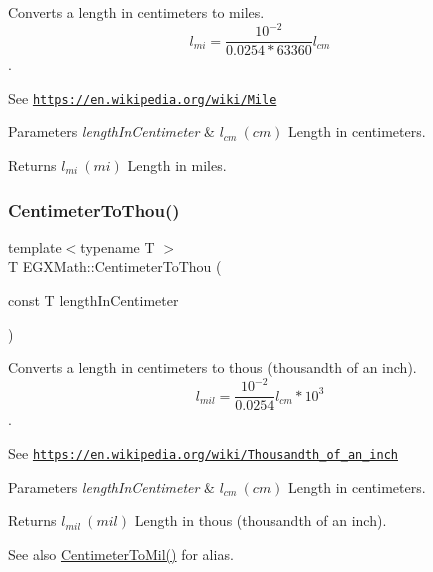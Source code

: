 Converts a length in centimeters to miles. \[ l_{mi}=\frac{10^{-2}}{0.0254 * 63360} l_{cm} \]. 

See \href{https://en.wikipedia.org/wiki/Mile}{\tt https\+://en.\+wikipedia.\+org/wiki/\+Mile} 
\begin{DoxyParams}{Parameters}
{\em length\+In\+Centimeter} & $ l_{cm}\ (cm)$ Length in centimeters. \\
\hline
\end{DoxyParams}
\begin{DoxyReturn}{Returns}
$ l_{mi}\ (mi)$ Length in miles. 
\end{DoxyReturn}
\mbox{\label{group___e_g_x_math-_conversions-_length_conversions-_centimeter-_imperial_ga06aee91cfbc90db20c6a085129dbf4fa}} 
\subsubsection{\texorpdfstring{Centimeter\+To\+Thou()}{CentimeterToThou()}}
{\footnotesize\ttfamily template$<$typename T $>$ \\
T E\+G\+X\+Math\+::\+Centimeter\+To\+Thou (\begin{DoxyParamCaption}\item[{const T}]{length\+In\+Centimeter }\end{DoxyParamCaption})}



Converts a length in centimeters to thous (thousandth of an inch). \[ l_{mil}= \frac{10^{-2}}{0.0254} l_{cm} * 10^{3} \]. 

See \href{https://en.wikipedia.org/wiki/Thousandth_of_an_inch}{\tt https\+://en.\+wikipedia.\+org/wiki/\+Thousandth\+\_\+of\+\_\+an\+\_\+inch} 
\begin{DoxyParams}{Parameters}
{\em length\+In\+Centimeter} & $ l_{cm}\ (cm)$ Length in centimeters. \\
\hline
\end{DoxyParams}
\begin{DoxyReturn}{Returns}
$ l_{mil}\ (mil)$ Length in thous (thousandth of an inch). 
\end{DoxyReturn}
\begin{DoxySeeAlso}{See also}
\mbox{\hyperlink{group___e_g_x_math-_conversions-_length_conversions-_centimeter-_imperial_ga4d32adb63d2c5ac44ce1f7a0ba746452}{Centimeter\+To\+Mil()}} for alias. 
\end{DoxySeeAlso}
\mbox{\label{group___e_g_x_math-_conversions-_length_conversions-_centimeter-_imperial_ga9b25beac97b6dfc0700508ca60760dfe}} 
